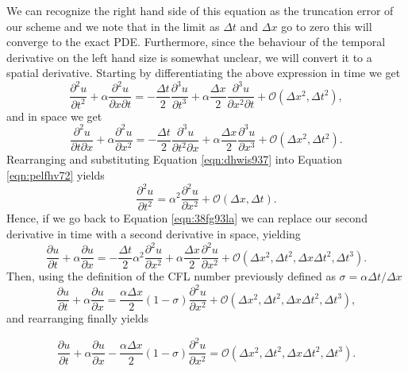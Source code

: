 We can recognize the right hand side of this equation as the truncation error of our scheme and we note that in the limit as $\Delta t$ and $\Delta x$ go to zero this will converge to the exact PDE. Furthermore, since the behaviour of the temporal derivative on the left hand size is somewhat unclear, we will convert it to a spatial derivative. Starting by differentiating the above expression in time we get
\begin{equation}
	\label{eqn:pelfhv72}
	\frac{\partial^2 u}{\partial t^2} + \alpha \frac{\partial^2 u}{\partial x \partial t} = -\frac{\Delta t}{2} \frac{\partial^3 u}{\partial t^3} + \alpha \frac{\Delta x}{2} \frac{\partial^3 u}{\partial x^2 \partial t} + \mathcal{O}(\Delta x^2,\Delta t^2),
\end{equation}
and in space we get
\begin{equation}
	\label{eqn:dhwis937}
	\frac{\partial^2 u}{\partial t \partial x} + \alpha \frac{\partial^2 u}{\partial x^2} = -\frac{\Delta t}{2} \frac{\partial^3 u}{\partial t^2 \partial x} + \alpha \frac{\Delta x}{2} \frac{\partial^3 u}{\partial x^3} + \mathcal{O}(\Delta x^2,\Delta t^2).
\end{equation}
Rearranging and substituting Equation \ref{eqn:dhwis937} into Equation \ref{eqn:pelfhv72} yields
\begin{equation}
	\frac{\partial^2 u}{\partial t^2} = \alpha^2 \frac{\partial^2 u}{\partial x^2} + \mathcal{O}(\Delta x,\Delta t).
\end{equation}
Hence, if we go back to Equation \ref{eqn:38fg93la} we can replace our second derivative in time with a second derivative in space, yielding
\begin{equation}
	\label{eqn:38fg93la}
	\frac{\partial u}{\partial t} + \alpha \frac{\partial u}{\partial x} = -\frac{\Delta t}{2} \alpha^2 \frac{\partial^2 u}{\partial x^2} + \alpha \frac{\Delta x}{2} \frac{\partial^2 u}{\partial x^2} + \mathcal{O}(\Delta x^2,\Delta t^2,\Delta x\Delta t^2,\Delta t^3).
\end{equation}
Then, using the definition of the CFL number previously defined as $\sigma = \alpha \Delta t / \Delta x$
\begin{equation}
	\frac{\partial u}{\partial t} + \alpha \frac{\partial u}{\partial x} = \frac{\alpha \Delta x}{2}(1-\sigma) \frac{\partial^2 u}{\partial x^2} + \mathcal{O}(\Delta x^2,\Delta t^2,\Delta x\Delta t^2,\Delta t^3),
\end{equation}
and rearranging finally yields
\begin{eqBox}
\begin{equation}
	\label{eqn:shrj986g}
	\frac{\partial u}{\partial t} + \alpha \frac{\partial u}{\partial x} - \frac{\alpha \Delta x}{2}(1-\sigma) \frac{\partial^2 u}{\partial x^2} = \mathcal{O}(\Delta x^2,\Delta t^2,\Delta x\Delta t^2,\Delta t^3).
\end{equation}
\end{eqBox}

